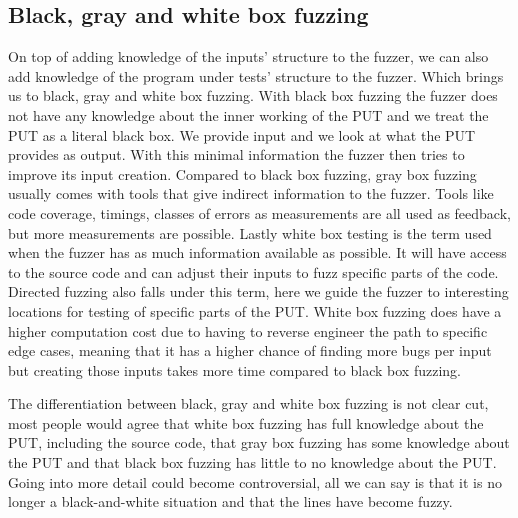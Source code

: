 \subsection{Black, gray and white box fuzzing}
\label{fuzzing:BlackGrayWhiteFuzzing}
On top of adding knowledge of the inputs' structure to the fuzzer, we can also add knowledge of the program under tests' structure to the fuzzer. Which brings us to black, gray and white box fuzzing. With black box fuzzing the fuzzer does not have any knowledge about the inner working of the PUT and we treat the PUT as a literal black box. We provide input and we look at what the PUT provides as output. With this minimal information the fuzzer then tries to improve its input creation. 
Compared to black box fuzzing, gray box fuzzing usually comes with tools that give indirect information to the fuzzer. Tools like code coverage, timings, classes of errors as measurements are all used as feedback, but more measurements are possible. 
Lastly white box testing is the term used when the fuzzer has as much information available as possible. It will have access to the source code and can adjust their inputs to fuzz specific parts of the code. Directed fuzzing also falls under this term, here we guide the fuzzer to interesting locations for testing of specific parts of the PUT. White box fuzzing does have a higher computation cost due to having to reverse engineer the path to specific edge cases, meaning that it has a higher chance of finding more bugs per input but creating those inputs takes more time compared to black box fuzzing. 

The differentiation between black, gray and white box fuzzing is not clear cut, most people would agree that white box fuzzing has full knowledge about the PUT, including the source code, that gray box fuzzing has some knowledge about the PUT and that black box fuzzing has little to no knowledge about the PUT. Going into more detail could become controversial, all we can say is that it is no longer a black-and-white situation and that the lines have become fuzzy.

